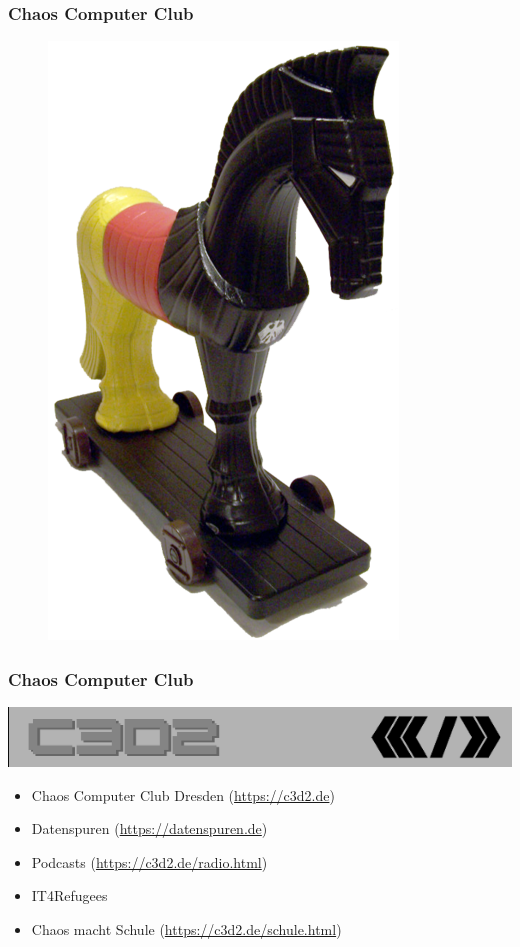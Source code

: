 \documentclass[12pt, xcolor={svgnames,table}]{beamer}
\begin{document}
\begin{frame}
  \frametitle{Chaos Computer Club}
  \begin{figure}
    \includegraphics[height=0.7\textheight]{img/trojaner.png}
  \end{figure}
\end{frame}

\begin{frame}
    \frametitle{Chaos Computer Club}
    \begin{center}
	\includegraphics[height=0.1\textheight]{img/c3d2_logo.png}
    \end{center}
    \begin{itemize}
      \item<1-> Chaos Computer Club Dresden (\url{https://c3d2.de})          
      \item<2-> Datenspuren (\url{https://datenspuren.de})
      \item<3-> Podcasts (\url{https://c3d2.de/radio.html})
      \item<4-> IT4Refugees
      \item<5-> Chaos macht Schule (\url{https://c3d2.de/schule.html})
    \end{itemize}
\end{frame}
\end{document}

